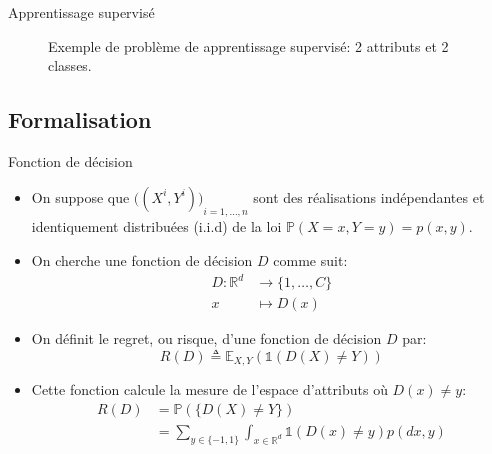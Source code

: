 \documentclass[8pt]{beamer}
\begin{document}
			\begin{frame}{Apprentissage supervisé}
				\begin{figure}[H]
					\begin{center}
						
						\caption*{\tiny Exemple de problème de apprentissage supervisé: 2 attributs et 2 classes.}
					\end{center}
				\end{figure}
			\end{frame}

		\subsection{Formalisation}
			\begin{frame}{Fonction de décision}
				\begin{itemize}
					\item<1-> On suppose que ${\big((X^i, Y^i)\big)}_{i=1,\dots,n}$ sont des réalisations indépendantes et identiquement distribuées (i.i.d) de la loi $\mathbb{P}(X=x, Y=y) = p(x,y)$.
					\item<2-> On cherche une fonction de décision $D$ comme suit:
					\begin{align*}
						D: \mathbb{R}^d &\rightarrow \{1, \dots, C\} \\
						x &\mapsto D(x)
					\end{align*}
					\item<3-> On définit le regret, ou risque, d'une fonction de décision $D$ par:
					\begin{equation}
						R(D) \triangleq \mathbb{E}_{X,Y}(\mathbb{1}(D(X)\neq Y))
					\end{equation}
					\item<4-> Cette fonction calcule la mesure de l'espace d'attributs où $D(x) \neq y$:
					\begin{align*}
						R(D) &= \mathbb{P}(\{D(X)\neq Y\})\\
							&= \sum_{y\in \{-1, 1\}} \int_{x \in \mathbb{R}^d} \mathbb{1}(D(x)\neq y) p(dx, y)
					\end{align*}
				\end{itemize}
			\end{frame}
\end{document}
